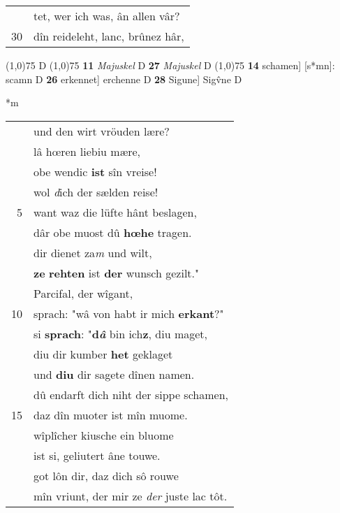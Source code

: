 \documentclass[8pt,a4paper,notitlepage]{article}
\begin{document}
\begin{table}[ht]
\begin{minipage}[t]{0.5\linewidth}
\begin{tabular}{rl}
 & tet, wer ich was, ân allen vâr?\\ 
30 & dîn reideleht, lanc, brûnez hâr,\\ 
\end{tabular}
\scriptsize
\line(1,0){75} \newline
D \newline
\line(1,0){75} \newline
\textbf{11} \textit{Majuskel} D  \textbf{27} \textit{Majuskel} D  \newline
\line(1,0){75} \newline
\textbf{14} schamen] [s*mn]: scamn D \textbf{26} erkennet] erchenne D \textbf{28} Sigune] Sigv̂ne D \newline
\end{minipage}
\hspace{0.5cm}
\begin{minipage}[t]{0.5\linewidth}
\small
\begin{center}*m
\end{center}
\begin{tabular}{rl}
 & und den wirt vröuden lære?\\ 
 & lâ hœren liebiu mære,\\ 
 & obe wendic \textbf{ist} sîn vreise!\\ 
 & wol \textit{d}ich der sælden reise!\\ 
5 & want waz die lüfte hânt beslagen,\\ 
 & dâr obe muost dû \textbf{hœhe} tragen.\\ 
 & dir dienet za\textit{m} und wilt,\\ 
 & \textbf{ze} \textbf{rehten} ist \textbf{der} wunsch gezilt."\\ 
 & Parcifal, der wîgant,\\ 
10 & sprach: "wâ von habt ir mich \textbf{erkant}?"\\ 
 & si \textbf{sprach}: "\textbf{d\textit{â}} bin ich\textbf{z}, diu maget,\\ 
 & diu dir kumber \textbf{het} geklaget\\ 
 & und \textbf{diu} dir sagete dînen namen.\\ 
 & dû endarft dich niht der sippe schamen,\\ 
15 & daz dîn muoter ist mîn muome.\\ 
 & wîplîcher kiusche ein bluome\\ 
 & ist si, geliutert âne touwe.\\ 
 & got lôn dir, daz dich sô rouwe\\ 
 & mîn vriunt, der mir ze \textit{der} juste lac tôt.\\ 

\end{tabular}
\end{minipage}
\end{table}
\end{document}
